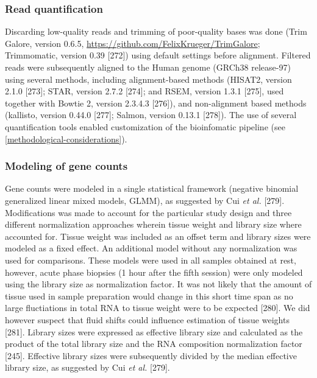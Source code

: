 \documentclass[twoside,10pt]{gihclass} %
\begin{document}
\hypertarget{read-quantification}{%
\subsubsection{Read quantification}\label{read-quantification}}

Discarding low-quality reads and trimming of poor-quality bases was done (Trim Galore, version 0.6.5, \url{https://github.com/FelixKrueger/TrimGalore}; Trimmomatic, version 0.39 {[}272{]}) using default settings before alignment. Filtered reads were subsequently aligned to the Human genome (GRCh38 release-97) using several methods, including alignment-based methods
(HISAT2, version 2.1.0 {[}273{]}; STAR, version 2.7.2 {[}274{]}; and
RSEM, version 1.3.1 {[}275{]},
used together with Bowtie 2, version 2.3.4.3 {[}276{]}),
and non-alignment based methods (kallisto, version 0.44.0 {[}277{]};
Salmon, version 0.13.1 {[}278{]}).
The use of several quantification tools enabled customization of the bioinfomatic pipeline (see \ref{methodological-considerations}).

\hypertarget{modeling-of-gene-counts}{%
\subsubsection{Modeling of gene counts}\label{modeling-of-gene-counts}}

Gene counts were modeled in a single statistical framework (negative binomial generalized linear mixed models, GLMM), as suggested by Cui \emph{et al.} {[}279{]}.
Modifications was made to account for the particular study design and three different normalization approaches wherein tissue weight and library size where accounted for. Tissue weight was included as an offset term and library sizes were modeled as a fixed effect.
An additional model without any normalization was used for comparisons.
These models were used in all samples obtained at rest, however, acute phase biopsies (1 hour after the fifth session) were only modeled using the library size as normalization factor. It was not likely that the amount of tissue used in sample preparation would change in this short time span as no large fluctiations in total RNA to tissue weight were to be expected
{[}280{]}.
We did however suspect that fluid shifts could influence estimation of tissue weights
{[}281{]}.
Library sizes were expressed as effective library size and calculated as the product of the total library size and the RNA composition normalization factor
{[}245{]}.
Effective library sizes were subsequently divided by the median effective library size, as suggested by Cui \emph{et al.}
{[}279{]}.
\end{document}
